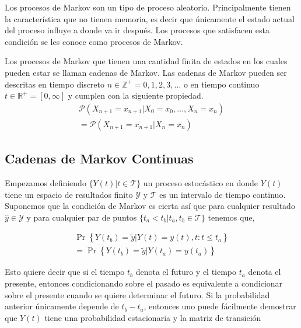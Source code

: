Los procesos de Markov son un tipo de proceso aleatorio. Principalmente tienen la característica que no tienen memoria, es decir que únicamente el estado actual del proceso influye a donde va ir después. Los procesos que satisfacen esta condición se les conoce como procesos de Markov.

Los procesos de Markov que tienen una cantidad finita de estados en los cuales pueden estar se llaman cadenas de Markov. Las cadenas de Markov pueden ser descritas en tiempo discreto $n \in \mathbb{Z}^+ = {0,1,2,3,\dots}$ o  en tiempo continuo $t \in \mathbb{R}^+ = [0, \infty]$ y cumplen con la siguiente propiedad.
\begin{equation}
    \begin{align}
        \mathcal{P} \left( X _ { n + 1 } = x _ { n + 1 } | X _ { 0 } = x _ { 0 } , \ldots , X _ { n } = x _ { n } \right) \\
        =\mathcal{P} \left( X _ { n + 1 } = x _ { n + 1 } | X _ { n } = x _ { n } \right)
    \end{align}
\end{equation}


\subsection{Cadenas de Markov Continuas}

Empezamos definiendo $\{Y(t)| t \in \mathcal{T}\}$ un proceso estocástico en donde $Y(t)$ tiene un espacio de resultados finito $\mathcal{Y}$ y $\mathcal{T}$ es un intervalo de tiempo continuo. Suponemos que la condición de Markov es cierta así que para cualquier resultado $\hat{y} \in \mathcal{Y}$ y para cualquier par de puntos $\{t_a < t_b | t_a,t_b \in \mathcal{T}\}$ tenemos que,

\begin{equation}
\begin{align}
    \operatorname { Pr } \left\{ Y \left( t _ { b } \right) = \tilde { y } | Y ( t ) = y ( t ) , t : t \leq t _ { a } \right\}   \\
    = \operatorname { Pr } \left\{ Y \left( t _ { b } \right) = \tilde { y } | Y \left( t _ { a } \right) = y \left( t _ { a } \right) \right\}
\end{align}
\end{equation}

Esto quiere decir que si el tiempo $t_b$ denota el futuro y el tiempo $t_a$ denota el presente, entonces condicionando sobre el pasado es equivalente a condicionar sobre el presente cuando se quiere determinar el futuro. Si la probabilidad anterior únicamente depende de $t_b - t_a$, entonces uno puede fácilmente demostrar que $Y(t)$ tiene una probabilidad estacionaria y la matriz de transición


